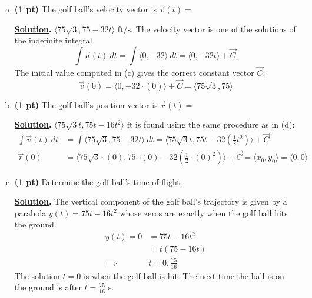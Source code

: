 \documentclass[12pt]{article}
\begin{document}
\begin{enumerate}[1.]
\begin{enumerate}[(a)]
	\vspace{1pc}
	\item {\bf (1 pt)} The golf ball's velocity vector is $\overrightarrow{v}(t)=$
	
	\vspace{0.5pc}
	{\bf\underline{Solution}.} $\boxed{\langle 75\sqrt{3},75-32t\rangle\text{ ft/s}.}$  The velocity vector is one of the solutions of the indefinite integral
	\[
	\int \overrightarrow{a}(t)\ dt = \int \langle 0,-32\rangle\ dt = \langle 0,-32t\rangle + \overrightarrow{C}.
	\]
	The initial value computed in (c) gives the correct constant vector $\overrightarrow{C}$:
	\[
	\overrightarrow{v}(0)=\langle 0,-32\cdot(0)\rangle + \overrightarrow{C} = \langle 75\sqrt{3},75\rangle 
	\]
		
	\vspace{1pc}
	\item {\bf (1 pt)} The golf ball's position vector is $\overrightarrow{r}(t)=$
	
	\vspace{0.5pc}
	{\bf\underline{Solution}.} $\boxed{\langle 75\sqrt{3}t,75t-16t^2\rangle\text{ ft}}$ is found using the same procedure as in (d):
	\[\begin{split}
	\int \overrightarrow{v}(t)\ dt &= \int \langle 75\sqrt{3},75-32t\rangle\ dt = \langle 75\sqrt{3}t,75t-32\left(\textstyle\frac{1}{2}t^2\right)\rangle + \overrightarrow{C} \\
	\overrightarrow{r}(0) &= \langle 75\sqrt{3}\cdot(0),75\cdot(0)-32\left(\textstyle\frac{1}{2}\cdot(0)^2\right)\rangle + \overrightarrow{C} =\langle x_0,y_0\rangle = \langle 0,0\rangle
	\end{split}\]
	
	\vspace{1pc}
	\item {\bf (1 pt)} Determine the golf ball's time of flight.
	
	\vspace{0.5pc}
	{\bf\underline{Solution}.} The vertical component of the golf ball's trajectory is given by a parabola $y(t)=75t-16t^2$ whose zeros are exactly when the golf ball hits the ground.  
	\[\begin{split}
	y(t)=0 &= 75t-16t^2 \\
		&= t(75-16t) \\
	\implies & t=0,\textstyle\frac{75}{16}
	\end{split}\]
	The solution $t=0$ is when the golf ball is hit.  The next time the ball is on the ground is after $\boxed{t=\textstyle\frac{75}{16}\text{ s.}}$
	

\end{enumerate}
\end{enumerate}
\end{document}
